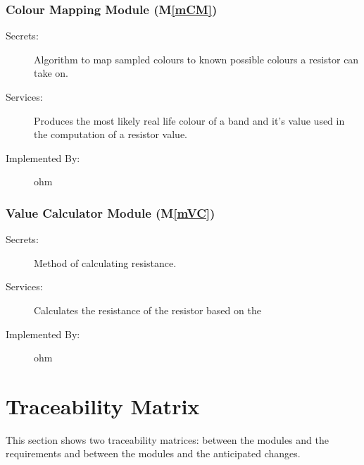 \documentclass[12pt, titlepage]{article}
\newcommand{\mref}[1]{M\ref{#1}}
\begin{document}
\subsubsection{Colour Mapping Module (\mref{mCM})}

\begin{description}
\item[Secrets:] Algorithm to map sampled colours to known possible colours a resistor can take on.
\item[Services:] Produces the most likely real life colour of a band and it's value used in the computation of a resistor value.
\item[Implemented By:] ohm
\end{description}

\subsubsection{Value Calculator Module (\mref{mVC})}

\begin{description}
\item[Secrets:] Method of calculating resistance.
\item[Services:] Calculates the resistance of the resistor based on the 
\item[Implemented By:] ohm
\end{description}

\newpage
\section{Traceability Matrix} \label{SecTM}

This section shows two traceability matrices: between the modules and the
requirements and between the modules and the anticipated changes.
\end{document}
